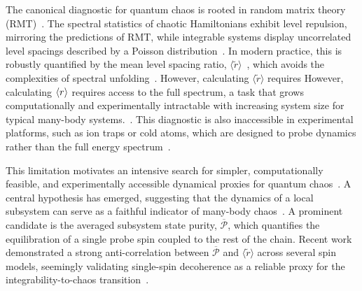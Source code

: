 \documentclass[letterpaper,superscriptaddress,aps,pra,nolongbibliography,showpacs,floatfix,dvipsnames,10pt,twocolumn]{revtex4-2}
\newcommand{\statep}{\overline{\mathcal{P}}}
\begin{document}
The canonical diagnostic for quantum chaos is rooted in random
matrix theory (RMT)~\cite{bohigas_1984_characterization, mehta_2004_random}. The spectral statistics of chaotic
Hamiltonians exhibit level repulsion, mirroring the predictions of
RMT, while integrable systems display uncorrelated level spacings
described by a Poisson distribution~\cite{berry_1977_level, akhshani_2025_statistical}. In modern practice,
this is robustly quantified by the mean level spacing ratio,
$\langle \tilde{r} \rangle$~\cite{oganesyan_2007_localization, atas_2013_distribution}, which avoids the complexities
of spectral unfolding~\cite{oganesyan_2007_localization}. However, calculating $\langle
\tilde{r} \rangle$ requires 
However, calculating $\ev{r}$ requires access to the full spectrum, 
a task that grows computationally and experimentally intractable with 
increasing system size for typical many-body systems.~\cite{scialchi_2024_integrabilitytochaos}. This diagnostic is also inaccessible in experimental
platforms, such as ion traps or cold atoms, which are designed to
probe dynamics rather than the full energy spectrum~\cite{das_2025_proposal, vallejo-fabila_2025_singlesite}.


This limitation motivates an intensive search for simpler,
computationally feasible, and experimentally accessible dynamical
proxies for quantum chaos~\cite{das_2025_proposal, scialchi_2024_integrabilitytochaos, c_2025_disordering}. 
A central hypothesis has emerged, suggesting that the dynamics of a local 
subsystem can serve as a faithful indicator of  many-body chaos~\cite{dalessio_2016_quantum, borgonovi_2025_timescales}. A
prominent candidate is the averaged subsystem state purity,
$\overline{\mathcal{P}}$, which quantifies the equilibration of a
single probe spin coupled to the rest of the chain. Recent work
demonstrated a strong anti-correlation between $\overline{\mathcal{P}}$
and $\langle \tilde{r} \rangle$ across several spin models, seemingly
validating single-spin decoherence as a reliable proxy for the
integrability-to-chaos transition~\cite{mirkin_2021_quantum}. 
\end{document}
